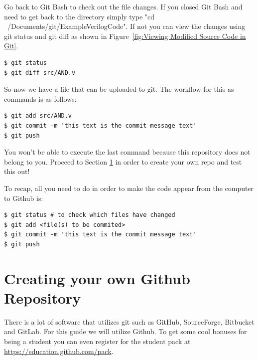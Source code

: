 \documentclass[12pt]{article}
\begin{document}
Go back to Git Bash to check out the file changes. If you closed Git Bash and need to get back to the directory simply type "cd ~/Documents/git/ExampleVerilogCode". If not you can view the changes using git status and git diff as shown in Figure~\ref{fig:Viewing Modified Source Code in Git}.

\begin{lstlisting}
$ git status
$ git diff src/AND.v
\end{lstlisting}

So now we have a file that can be uploaded to git. The workflow for this as commands is as follows:

\begin{lstlisting}
$ git add src/AND.v
$ git commit -m 'this text is the commit message text'
$ git push
\end{lstlisting}

You won't be able to execute the last command because this repository does not belong to you. Proceed to Section \ref{Creating your own Github Repository} in order to create your own repo and test this out!

To recap, all you need to do in order to make the code appear from the computer to Github is:

\begin{lstlisting}
$ git status # to check which files have changed
$ git add <file(s) to be commited>
$ git commit -m 'this text is the commit message text'
$ git push
\end{lstlisting}






\clearpage
\section{Creating your own Github Repository} \label{Creating your own Github Repository}
There is a lot of software that utilizes git such as GitHub, SourceForge, Bitbucket and GitLab. For this guide we will utilize Github. To get some cool bonuses for being a student you can even register for the student pack at \href{https://education.github.com/pack}{https://education.github.com/pack}.
\end{document}
